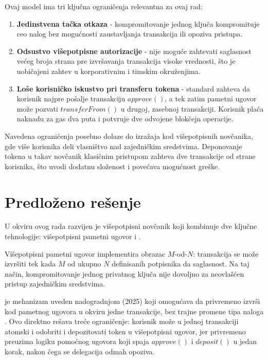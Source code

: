 Ovaj model ima tri klju\v cna ograni\v cenja relevantna za ovaj rad:

\begin{enumerate}
  \item \textbf{Jedinstvena ta\v cka otkaza} - kompromitovanje jednog klju\v ca kompromituje ceo nalog bez mogu\' cnosti zaustavljanja transakcija ili opoziva pristupa.
  \item \textbf{Odsustvo vi\v sepotpisne autorizacije} - nije mogu\' ce zahtevati saglasnost ve\' ceg broja strana pre izvr\v savanja transakcija visoke vrednosti, \v sto je uobi\v cajeni zahtev u korporativnim i timskim okru\v zenjima.
  \item \textbf{Lo\v se korisni\v cko iskustvo pri transferu  tokena} - standard  \cite{erc20} zahteva da korisnik najpre po\v salje transakciju $approve()$, a tek zatim pametni ugovor mo\v ze pozvati $transferFrom()$ u drugoj, zasebnoj transakciji. Korisnik pla\' ca naknadu za gas dva puta i potvr\dj uje dve odvojene blok\v cejn operacije.
\end{enumerate}

Navedena ograni\v cenja posebno dolaze do izra\v zaja kod vi\v sepotpisnih nov\v canika, gde vi\v se korisnika deli vlasni\v stvo nad zajedni\v ckim sredstvima. Deponovanje  tokena u takav nov\v canik klasi\v cnim pristupom zahteva dve transakcije od strane korisnika, \v sto uvodi dodatnu slo\v zenost i pove\' cava mogu\' cnost gre\v ske.

\section{Predlo\v zeno re\v senje}

U okviru ovog rada razvijen je  vi\v sepotpisni nov\v canik koji kombinuje dve klju\v cne tehnologije: vi\v sepotpisni pametni ugovor i  \cite{eip7702}.

Vi\v sepotpisni pametni ugovor implementira obrazac $M$-od-$N$: transakcija se mo\v ze izvr\v siti tek kada $M$ od ukupno $N$ definisanih potpisnika da saglasnost. Na taj na\v cin, kompromitovanje jednog privatnog klju\v ca nije dovoljno za neovla\v s\' cen pristup zajedni\v ckim sredstvima.

 je mehanizam uveden  nadogradnjom  (2025) \cite{pectra2025} koji omogu\' cava da  privremeno izvr\v si kod pametnog ugovora u okviru jedne transakcije, bez trajne promene tipa naloga \cite{eip7702}. Ovo direktno re\v sava tre\' ce ograni\v cenje: korisnik mo\v ze u jednoj transakciji atomski i odobriti i depozitovati  token u vi\v sepotpisni ugovor, jer  privremeno preuzima logiku pomo\' cnog ugovora koji spaja $approve()$ i $deposit()$ u jedan korak, nakon \v cega se delegacija odmah opoziva.

